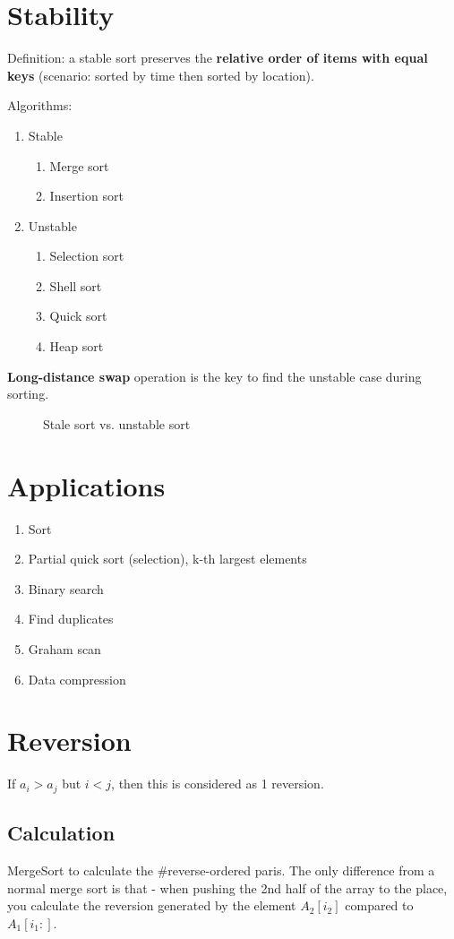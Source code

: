 \section{Stability}
Definition: a stable sort preserves the \textbf{relative order of items with equal keys} (scenario: sorted by time then sorted by location). 

Algorithms:
\begin{enumerate}
\item Stable
\begin{enumerate}
\item Merge sort
\item Insertion sort
\end{enumerate} 
\item Unstable
\begin{enumerate}
\item Selection sort
\item Shell sort
\item Quick sort
\item Heap sort
\end{enumerate}
\end{enumerate}
\textbf{Long-distance swap} operation is the key to find the unstable case during sorting. 
\begin{figure}[hbtp]
\centering
{}
\caption{Stale sort vs. unstable sort}
\label{fig:trie} 
\end{figure}

\section{Applications}
\begin{enumerate}
\item Sort
\item Partial quick sort (selection), k-th largest elements 
\item Binary search
\item Find duplicates 
\item Graham scan
\item Data compression
\end{enumerate}


\section{Reversion}
If $a_i > a_j$ but $i<j$, then this is considered as 1 reversion. 

\subsection{Calculation}
MergeSort to calculate the \#reverse-ordered paris. The only difference from a normal merge sort is that - when pushing the 2nd half of the array to the place, you calculate the reversion generated by the element $A_2[i_2]$ compared to $A_1[i_1:]$.

